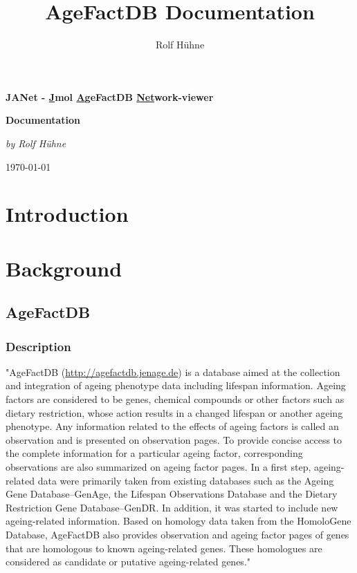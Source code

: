 \documentclass[12pt,a4paper,notitlepage,twoside]{report}
\begin{document}
\title{AgeFactDB Documentation}
\author{Rolf H\"{u}hne}

\begin{titlepage}
	\centering
	{\huge\bfseries JANet - \underline{J}mol \underline{A}geFactDB \underline{Net}work-viewer\par}
	\vspace{1cm}
	{\huge\bfseries Documentation\par}
	\vspace{1cm}
	{\Large\itshape by Rolf H\"{u}hne\par}
	\vfill

	\vfill

	{\large \today\par}
\end{titlepage}

\tableofcontents
\listoffigures

\chapter{Introduction}
\label{chap:introduction}



\chapter{Background}
\label{chap:background}

\section{AgeFactDB}
\label{sec:agefactdb}

\subsection{Description}
"AgeFactDB (\href{http://agefactdb.jenage.de}{http://agefactdb.jenage.de}) is a database aimed at the collection and integration of ageing phenotype data including lifespan information. Ageing factors are considered to be genes, chemical compounds or other factors such as dietary restriction, whose action results in a changed lifespan or another ageing phenotype. Any information related to the effects of ageing factors is called an observation and is presented on observation pages. To provide concise access to the complete information for a particular ageing factor, corresponding observations are also summarized on ageing factor pages. In a first step, ageing-related data were primarily taken from existing databases such as the Ageing Gene Database--GenAge, the Lifespan Observations Database and the Dietary Restriction Gene Database--GenDR. In addition, it was started to include new ageing-related information. Based on homology data taken from the HomoloGene Database, AgeFactDB also provides observation and ageing factor pages of genes that are homologous to known ageing-related genes. These homologues are considered as candidate or putative ageing-related genes." \cite{huehne2014}
\end{document}
